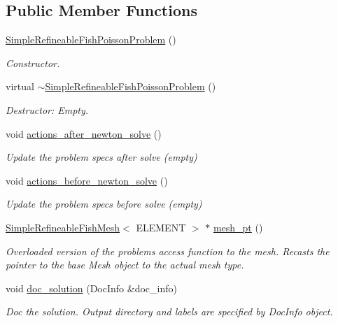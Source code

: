 \subsection*{Public Member Functions}
\begin{DoxyCompactItemize}
\item 
\hyperlink{classSimpleRefineableFishPoissonProblem_a8ae306f40e7e2e0cf20c5377e190716d}{Simple\+Refineable\+Fish\+Poisson\+Problem} ()
\begin{DoxyCompactList}\small\item\em Constructor. \end{DoxyCompactList}\item 
virtual \hyperlink{classSimpleRefineableFishPoissonProblem_ab72c23e589ff55593d0a13e5ab57d070}{$\sim$\+Simple\+Refineable\+Fish\+Poisson\+Problem} ()
\begin{DoxyCompactList}\small\item\em Destructor\+: Empty. \end{DoxyCompactList}\item 
void \hyperlink{classSimpleRefineableFishPoissonProblem_a68d717e7c5b403236fdce799599b8c29}{actions\+\_\+after\+\_\+newton\+\_\+solve} ()
\begin{DoxyCompactList}\small\item\em Update the problem specs after solve (empty) \end{DoxyCompactList}\item 
void \hyperlink{classSimpleRefineableFishPoissonProblem_af1b13d49ace6c248a0a8021103f139a5}{actions\+\_\+before\+\_\+newton\+\_\+solve} ()
\begin{DoxyCompactList}\small\item\em Update the problem specs before solve (empty) \end{DoxyCompactList}\item 
\hyperlink{classSimpleRefineableFishMesh}{Simple\+Refineable\+Fish\+Mesh}$<$ E\+L\+E\+M\+E\+NT $>$ $\ast$ \hyperlink{classSimpleRefineableFishPoissonProblem_af7b30bf0ed7fed95b40bbdca9ce295a0}{mesh\+\_\+pt} ()
\begin{DoxyCompactList}\small\item\em Overloaded version of the problem\textquotesingle{}s access function to the mesh. Recasts the pointer to the base Mesh object to the actual mesh type. \end{DoxyCompactList}\item 
void \hyperlink{classSimpleRefineableFishPoissonProblem_a59e92fc454dea540b48a1a12751efc5b}{doc\+\_\+solution} (Doc\+Info \&doc\+\_\+info)
\begin{DoxyCompactList}\small\item\em Doc the solution. Output directory and labels are specified by Doc\+Info object. \end{DoxyCompactList}\end{DoxyCompactItemize}



